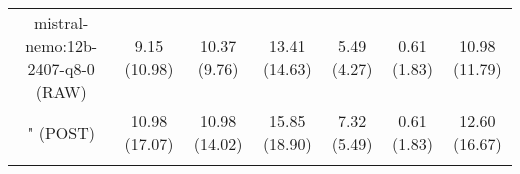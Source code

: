 \begin{table}[]
{\begin{tabular}{ccccccc}
        \multicolumn{1}{c|}{mistral-nemo:12b-2407-q8-0 (RAW)} & 9.15 (10.98) & 10.37 (9.76) & \multicolumn{1}{c|}{13.41 (14.63)} & 5.49 (4.27) & \multicolumn{1}{c|}{0.61 (1.83)} & 10.98 (11.79) \\
        
        

        \multicolumn{1}{c|}{" (POST)} & 10.98 (17.07) & 10.98 (14.02) & \multicolumn{1}{c|}{15.85 (18.90)} & 7.32 (5.49) & \multicolumn{1}{c|}{0.61 (1.83)} & 12.60 (16.67) \\
        \cline{1-7}
        
\\ \hline
\end{tabular}%
}
\end{table}
    